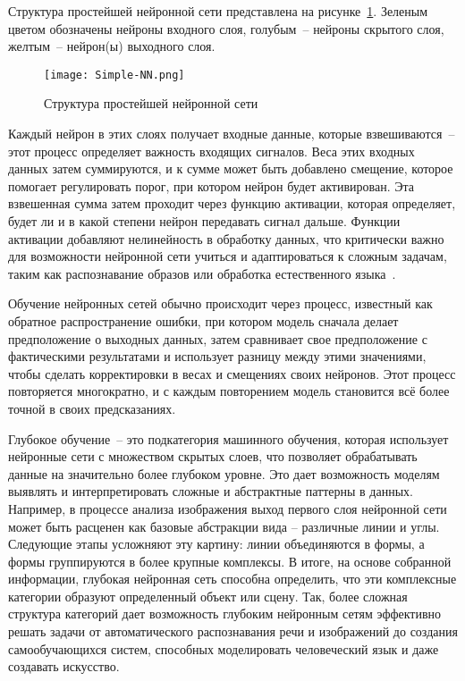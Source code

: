 Структура простейшей нейронной сети представлена на рисунке~\ref{domain::simple-nn}. Зеленым цветом обозначены нейроны входного слоя, голубым~-- нейроны скрытого слоя, желтым~-- нейрон(ы) выходного слоя.

\begin{figure}[ht]
    \centering
    \texttt{[image: Simple-NN.png]}
    \caption{Структура простейшей нейронной сети}
    \label{domain::simple-nn}
\end{figure}

Каждый нейрон в этих слоях получает входные данные, которые взвешиваются~-- этот процесс определяет важность входящих сигналов. Веса этих входных данных затем суммируются, и к сумме может быть добавлено смещение, которое помогает регулировать порог, при котором нейрон будет активирован. Эта взвешенная сумма затем проходит через функцию активации, которая определяет, будет ли и в какой степени нейрон передавать сигнал дальше. Функции активации добавляют нелинейность в обработку данных, что критически важно для возможности нейронной сети учиться и адаптироваться к сложным задачам, таким как распознавание образов или обработка естественного языка~\cite{speach_neural}.

Обучение нейронных сетей обычно происходит через процесс, известный как обратное распространение ошибки, при котором модель сначала делает предположение о выходных данных, затем сравнивает свое предположение с фактическими результатами и использует разницу между этими значениями, чтобы сделать корректировки в весах и смещениях своих нейронов. Этот процесс повторяется многократно, и с каждым повторением модель становится всё более точной в своих предсказаниях.

Глубокое обучение~-- это подкатегория машинного обучения, которая использует нейронные сети с множеством скрытых слоев, что позволяет обрабатывать данные на значительно более глубоком уровне. Это дает возможность моделям выявлять и интерпретировать сложные и абстрактные паттерны в данных. Например, в процессе анализа изображения выход первого слоя нейронной сети может быть расценен как базовые абстракции вида – различные линии и углы. Следующие этапы усложняют эту картину: линии объединяются в формы, а формы группируются в более крупные комплексы. В итоге, на основе собранной информации, глубокая нейронная сеть способна определить, что эти комплексные категории образуют определенный объект или сцену. Так, более сложная структура категорий дает возможность глубоким нейронным сетям эффективно решать задачи от автоматического распознавания речи и изображений до создания самообучающихся систем, способных моделировать человеческий язык и даже создавать искусство.

